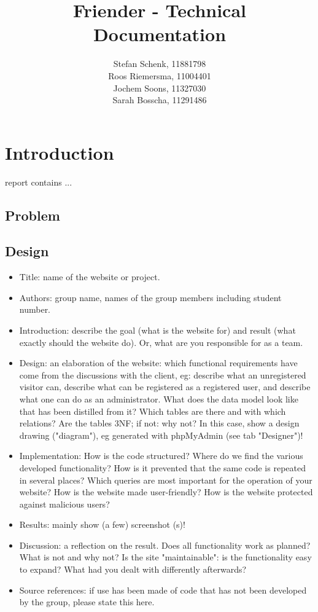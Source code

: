 \documentclass[journal]{IEEEtran}
\begin{document}
\title{Friender - Technical Documentation}
\author{Stefan Schenk, 11881798\\
Roos Riemersma, 11004401\\
Jochem Soons, 11327030\\
Sarah Bosscha, 11291486}



\maketitle

\section{Introduction}
 report contains ...

\subsection{Problem}

\subsection{Design}
\label{subsec:design}

\begin{itemize}
	\item Title: name of the website or project.
	\item Authors: group name, names of the group members including student number.
	\item Introduction: describe the goal (what is the website for) and result (what exactly should the website do). Or, what are you responsible for as a team.
	\item Design: an elaboration of the website: which functional requirements have come from the discussions with the client, eg: describe what an unregistered visitor can, describe what can be registered as a registered user, and describe what one can do as an administrator. What does the data model look like that has been distilled from it? Which tables are there and with which relations? Are the tables 3NF; if not: why not? In this case, show a design drawing ("diagram"), eg generated with phpMyAdmin (see tab "Designer")!
	\item Implementation: How is the code structured? Where do we find the various developed functionality? How is it prevented that the same code is repeated in several places? Which queries are most important for the operation of your website? How is the website made user-friendly? How is the website protected against malicious users?
	\item Results: mainly show (a few) screenshot (s)!
	\item Discussion: a reflection on the result. Does all functionality work as planned? What is not and why not? Is the site "maintainable": is the functionality easy to expand? What had you dealt with differently afterwards?
	\item Source references: if use has been made of code that has not been developed by the group, please state this here.
\end{itemize}
\end{document}
